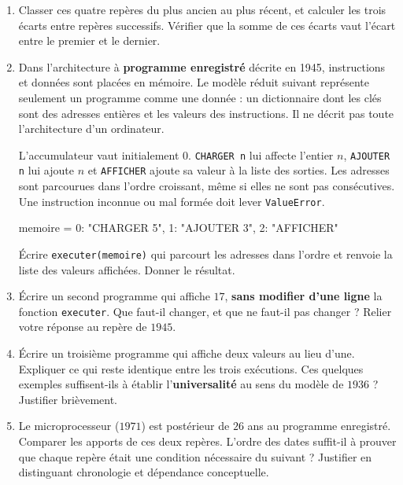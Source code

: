 \begin{enumerate}
  \item Classer ces quatre repères du plus ancien au plus récent, et calculer
    les trois écarts entre repères successifs. Vérifier que la somme de ces
    écarts vaut l'écart entre le premier et le dernier.

  \item Dans l'architecture à \textbf{programme enregistré} décrite en 1945,
    instructions et données sont placées en mémoire. Le modèle réduit suivant
    représente seulement un programme comme une donnée : un dictionnaire dont
    les clés sont des adresses entières et les valeurs des instructions.
    Il ne décrit pas toute l'architecture d'un ordinateur.

    L'accumulateur vaut initialement $0$. \lstinline{CHARGER n} lui affecte
    l'entier $n$, \lstinline{AJOUTER n} lui ajoute $n$ et
    \lstinline{AFFICHER} ajoute sa valeur à la liste des sorties. Les adresses
    sont parcourues dans l'ordre croissant, même si elles ne sont pas
    consécutives. Une instruction inconnue ou mal formée doit lever
    \lstinline{ValueError}.

\begin{python}
memoire = {0: "CHARGER 5", 1: "AJOUTER 3", 2: "AFFICHER"}
\end{python}

    Écrire \lstinline{executer(memoire)} qui parcourt les adresses dans l'ordre
    et renvoie la liste des valeurs affichées. Donner le résultat.

  \item Écrire un second programme qui affiche $17$, \textbf{sans modifier
    d'une ligne} la fonction \lstinline{executer}. Que faut-il changer, et que
    ne faut-il pas changer ? Relier votre réponse au repère de $1945$.

  \item Écrire un troisième programme qui affiche deux valeurs au lieu d'une.
    Expliquer ce qui reste identique entre les trois exécutions. Ces quelques
    exemples suffisent-ils à établir l'\textbf{universalité} au sens du modèle
    de $1936$ ? Justifier brièvement.

  \item Le microprocesseur ($1971$) est postérieur de $26$ ans au programme
    enregistré. Comparer les apports de ces deux repères. L'ordre des dates
    suffit-il à prouver que chaque repère était une condition nécessaire du
    suivant ? Justifier en distinguant chronologie et dépendance conceptuelle.
\end{enumerate}

